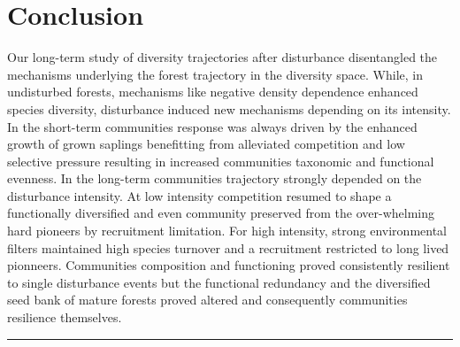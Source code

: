 \documentclass[fleqn,10pt]{ArtEcoFoG} %
\begin{document}
\section{Conclusion}\label{conclusion}

Our long-term study of diversity trajectories after disturbance
disentangled the mechanisms underlying the forest trajectory in the
diversity space. While, in undisturbed forests, mechanisms like negative
density dependence enhanced species diversity, disturbance induced new
mechanisms depending on its intensity. In the short-term communities
response was always driven by the enhanced growth of grown saplings
benefitting from alleviated competition and low selective pressure
resulting in increased communities taxonomic and functional evenness. In
the long-term communities trajectory strongly depended on the
disturbance intensity. At low intensity competition resumed to shape a
functionally diversified and even community preserved from the
over-whelming hard pioneers by recruitment limitation. For high
intensity, strong environmental filters maintained high species turnover
and a recruitment restricted to long lived pionneers. Communities
composition and functioning proved consistently resilient to single
disturbance events but the functional redundancy and the diversified
seed bank of mature forests proved altered and consequently communities
resilience themselves.

\begin{center}\rule{0.5\linewidth}{\linethickness}\end{center}





\end{document}
